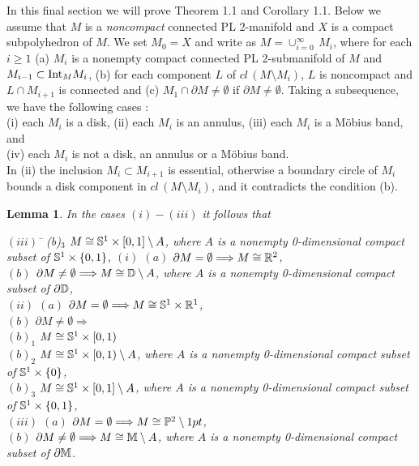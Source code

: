\documentclass[11pt]{amsart}
\newtheorem{lemma}{Lemma}[section]
\theoremstyle{definition}
\newtheorem*{Proof of Theorem 3.1}{Proof of Theorem 3.1}
\newtheorem*{Proof of Corollary 3.1}{Proof of Corollary 3.1}
\newtheorem*{Proof of Proposition 4.1.(1)}{Proof of Proposition 4.1.(1)}
\newtheorem*{Proof of Proposition 4.1.(2)}{Proof of Proposition 4.1.(2)}
\newtheorem*{Proof of Corollary 1.1}{Proof of Corollary 1.1}
\begin{document}
In this final section we will prove Theorem 1.1 and Corollary 1.1.  
Below we assume that $M$ is a {\it noncompact} connected PL 2-manifold and $X$ is a compact subpolyhedron of $M$. 
We set $M_0 = X$ and write as $M = \cup_{i=0}^{\infty} \, M_i$, where for each $i \geq 1$ (a) $M_i$ is a nonempty compact connected PL 2-submanifold of $M$ and $M_{i-1} \subset {\rm Int}_M M_i$, (b) for each component $L$ of $cl \, (M \setminus M_i)$, $L$ is noncompact and $L \cap M_{i+1}$ is connected and (c) $M_1 \cap \partial M \neq \emptyset$ if $\partial M \neq \emptyset$. Taking a subsequence, we have the following cases : \\
\hspace*{4pt} (i) each $M_i$ is a disk, (ii) each $M_i$ is an annulus, (iii) each $M_i$ is a M\"obius band, and \\ \hspace*{4pt} (iv) each $M_i$ is not a disk, an annulus or a M\"obius band. \\
In (ii) the inclusion $M_i \subset M_{i+1}$ is essential, otherwise a boundary circle of $M_i$ bounds a disk component in $cl \, (M \setminus M_i)$, and it contradicts the condition (b).

\begin{lemma}
In the cases $(i) - (iii)$ it follows that 
\begin{tabbing}
$(iii)$ \= \hspace{3pt} (b)$_3$ $M \cong {\Bbb S}^1 \times [0,1] \setminus A$, where $A$ is a nonempty 0-dimensional compact subset of ${\Bbb S}^1 \times \{ 0,1 \}$, \kill
$(i)$ \> $(a)$ $\partial M = \emptyset \Longrightarrow M \cong {\Bbb R}^2$, \\ 
\> $(b)$ $\partial M \neq \emptyset \Longrightarrow M \cong {\Bbb D} \setminus A$, where $A$ is a nonempty 0-dimensional compact subset of $\partial {\Bbb D}$, \\
$(ii)$ \> $(a)$ $\partial M = \emptyset \Longrightarrow M \cong {\Bbb S}^1 \times {\Bbb R}^1$, \\
\> $(b)$ $\partial M \neq \emptyset \Longrightarrow$ \\ 
\> \hspace{3pt} $(b)_1$ $M \cong {\Bbb S}^1 \times [0,1)$ \\ 
\> \hspace{3pt} $(b)_2$ $M \cong {\Bbb S}^1 \times [0,1) \setminus A$, where $A$ is a nonempty 0-dimensional compact subset of ${\Bbb S}^1 \times \{ 0 \}$, \\
\> \hspace{3pt} $(b)_3$ $M \cong {\Bbb S}^1 \times [0,1] \setminus A$, where $A$ is a nonempty 0-dimensional compact subset of ${\Bbb S}^1 \times \{ 0,1 \}$, \\
$(iii)$ \> $(a)$ $\partial M = \emptyset \Longrightarrow M \cong {\Bbb P}^2 \setminus 1pt$, \\
\> $(b)$ $\partial M \neq \emptyset \Longrightarrow M \cong {\Bbb M} \setminus A$, where $A$ is a nonempty 0-dimensional compact subset of $\partial {\Bbb M}$.
\end{tabbing}
\end{lemma}
\end{document}
